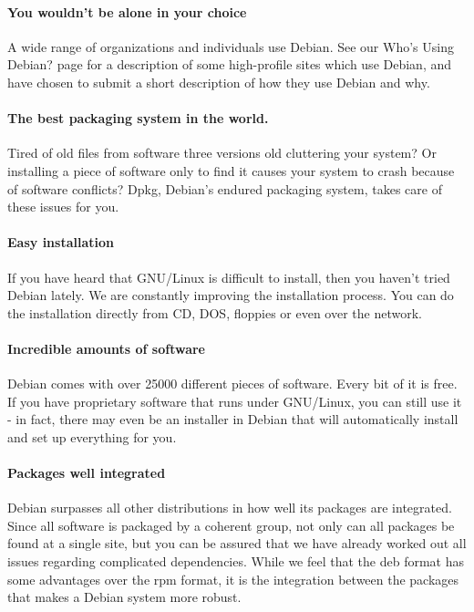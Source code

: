\documentclass[letterpaper,landscape]{report}
\begin{document}
\begin{multicols}{3}
\paragraph{You wouldn't be alone in your choice}

A wide range of organizations and individuals use Debian. See our Who's Using
Debian? page for a description of some high-profile sites which use Debian, and
have chosen to submit a short description of how they use Debian and why.

\paragraph{The best packaging system in the world.}

Tired of old files from software three versions old cluttering your system? Or
installing a piece of software only to find it causes your system to crash
because of software conflicts? Dpkg, Debian's endured packaging system, takes
care of these issues for you.

\paragraph{Easy installation}

If you have heard that GNU/Linux is difficult to install, then you haven't
tried Debian lately. We are constantly improving the installation process. You
can do the installation directly from CD, DOS, floppies or even over the
network.

\paragraph{Incredible amounts of software}

Debian comes with over 25000 different pieces of software. Every bit of it is
free. If you have proprietary software that runs under GNU/Linux, you can still
use it - in fact, there may even be an installer in Debian that will
automatically install and set up everything for you.

\paragraph{Packages well integrated}

Debian surpasses all other distributions in how well its packages are
integrated. Since all software is packaged by a coherent group, not only can
all packages be found at a single site, but you can be assured that we have
already worked out all issues regarding complicated dependencies. While we feel
that the deb format has some advantages over the rpm format, it is the
integration between the packages that makes a Debian system more robust.


\end{multicols}
\end{document}
